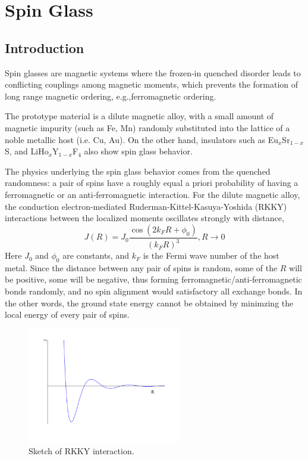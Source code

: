 \chapter{Spin Glass}
\label{chap:SGintro}
\section{Introduction}
Spin glasses are magnetic systems where the frozen-in quenched  
disorder leads to conflicting couplings among magnetic moments, which prevents the formation 
of long range magnetic ordering, e.g.,ferromagnetic ordering.

The prototype material is a dilute magnetic alloy, with a small amount of 
magnetic impurity (such as Fe, Mn) randomly substituted into the lattice of a 
noble metallic host (i.e. Cu, Au). On the other hand, insulators such as 
Eu$_x$Sr$_{1-x}$S, and LiHo$_{x}$Y$_{1-x}$F$_{4}$ also show spin glass behavior.
 

The physics underlying the spin glass behavior comes from the quenched 
randomness: a pair of spins have a roughly equal a priori probability of having
a ferromagnetic or an anti-ferromagnetic interaction. For the dilute magnetic 
alloy, the conduction electron-mediated 
Ruderman-Kittel-Kasuya-Yoshida (RKKY) interactions between the localized moments
 oscillates strongly with distance, 
 \begin{equation}
   \label{eq:RKKY}
   J(R)=J_0\frac{\cos(2k_FR+\phi_0)}{(k_FR)^3}, R\rightarrow 0
 \end{equation}
Here $J_0$ and $\phi_0$ are constants, and $k_F$ is the Fermi wave number of the
host metal. Since the distance between any pair of spins is random, some of the $R$
will be positive, some will be negative,
thus forming ferromagnetic/anti-ferromagnetic bonds randomly, and no spin 
alignment would satisfactory all exchange bonds. In the other words, the 
ground state energy cannot be obtained by minimzing the local energy 
of every pair of spins.

\begin{figure}[!h]
  \label{fig:rkky}
  \centering
  \includegraphics[width=0.6\textwidth]{img/RKKY.png}
  \caption{Sketch of RKKY interaction.}
\end{figure}

